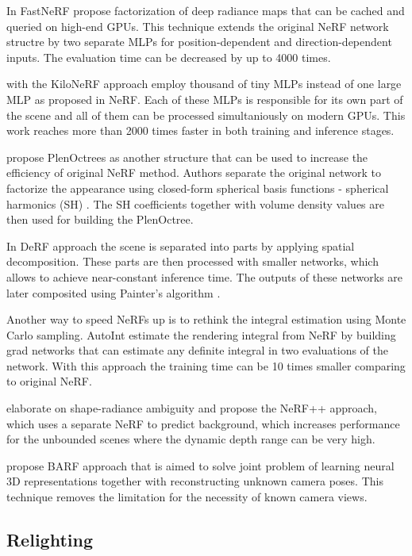 In FastNeRF \cite{garbin2021fastnerf} propose factorization of deep radiance maps
that can be cached and queried on high-end GPUs.
This technique extends the original NeRF network structre
by two separate MLPs for position-dependent and direction-dependent inputs.
The evaluation time can be decreased by up to 4000 times.

\cite{reiser2021kilonerf} with the KiloNeRF approach employ thousand of tiny MLPs 
instead of one large MLP as proposed in NeRF.
Each of these MLPs is responsible for its own part of the scene
and all of them can be processed simultaniously on modern GPUs.
This work reaches more than 2000 times faster in both training and inference stages.

\cite{yu2021plenoctrees} propose PlenOctrees as another structure that can be used to increase the efficiency of original NeRF method.
Authors separate the original network to factorize the appearance using closed-form
spherical basis functions - spherical harmonics (SH) \cite{mohlenkamp1997spherical}.
The SH coefficients together with volume density values are then used
for building the PlenOctree.

In DeRF approach \cite{rebain2020derf} the scene is separated into parts by applying spatial decomposition.
These parts are then processed with smaller networks, which allows to achieve near-constant inference time.
The outputs of these networks are later composited using Painter's algorithm \cite{deBerg2008}.

Another way to speed NeRFs up is to rethink the integral estimation using Monte Carlo sampling.
AutoInt \cite{lindell2021autoint} estimate the rendering integral from NeRF
by building grad networks that can estimate any definite integral in two evaluations of the network.
With this approach the training time can be 10 times smaller comparing to original NeRF.

\cite{zhang2020nerf} elaborate on shape-radiance ambiguity
and propose the NeRF++ approach, which uses a separate NeRF to predict background,
which increases performance for the unbounded scenes where the dynamic depth range can be very high.

\cite{lin2021barf} propose BARF approach that is aimed to solve joint problem
of learning neural 3D representations together with reconstructing unknown camera poses.
This technique removes the limitation for the necessity of known camera views.

\subsection{Relighting}


